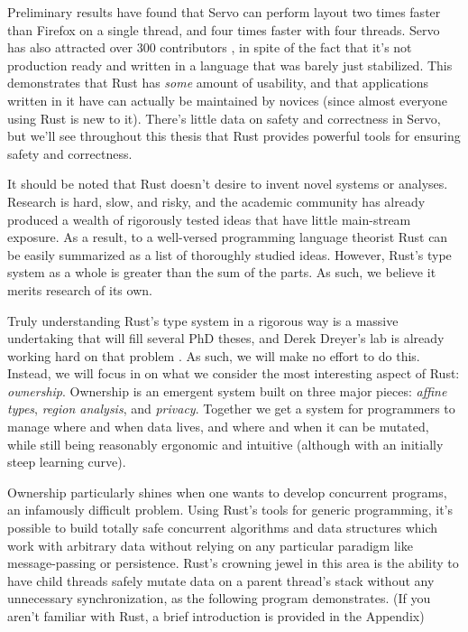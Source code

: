 Preliminary results \cite{servo-exp} have found that Servo can
perform layout two times faster than Firefox on a single thread, and four times
faster with four threads. Servo has also attracted over 300 contributors
\cite{servo-gh}, in spite of the fact that it's not production ready and
written in a language that was barely just stabilized. This demonstrates that
Rust has \emph{some} amount of usability, and that applications written in it
have can actually be maintained by novices (since almost everyone using Rust
is new to it). There's little data on safety and correctness in Servo, but we'll
see throughout this thesis that Rust provides powerful tools for ensuring
safety and correctness.

It should be noted that Rust doesn't desire to invent novel systems or analyses.
Research is hard, slow, and risky, and the academic community has already produced
a wealth of rigorously tested ideas that have little main-stream exposure. As a
result, to a well-versed programming language theorist Rust can be easily
summarized as a list of thoroughly studied ideas. However, Rust's type system
as a whole is greater than the sum of the parts. As such, we believe it merits
research of its own.

Truly understanding Rust's type system in a rigorous way is a massive
undertaking that will fill several PhD theses, and Derek Dreyer's lab is already
working hard on that problem \cite{rustbelt}. As such, we will make no effort
to do this. Instead, we will focus in on what we consider the most interesting
aspect of Rust: \emph{ownership}. Ownership is an emergent system built on three
major pieces: \emph{affine types}, \emph{region analysis}, and \emph{privacy}. Together we get
a system for programmers to manage where and when data lives, and where
and when it can be mutated, while still being reasonably ergonomic and intuitive
(although with an initially steep learning curve).

Ownership particularly shines when one wants to develop concurrent programs,
an infamously difficult problem. Using Rust's tools for generic programming,
it's possible to build totally safe concurrent algorithms and data structures
which work with arbitrary data without relying on any particular paradigm like
message-passing or persistence. Rust's crowning jewel in this area is the
ability to have child threads safely mutate data on a parent thread's stack
without any unnecessary synchronization, as the following program demonstrates.
(If you aren't familiar with Rust, a brief introduction is provided in the Appendix)

